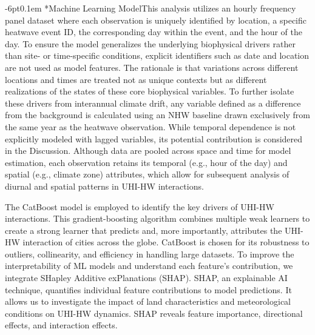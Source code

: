\documentclass[]{nature}
\makeatletter
\renewcommand{\subsection}{\@startsection {subsection}{2}{0pt}%
    {-6pt}{0.1em}%
    {\fontsize{12pt}{14pt}\selectfont\sffamily\bfseries}%
    }
\makeatother
\begin{document}
\subsection*{Machine Learning Model}This analysis utilizes an hourly frequency panel dataset where each observation is uniquely identified by location, a specific heatwave event ID, the corresponding day within the event, and the hour of the day. To ensure the model generalizes the underlying biophysical drivers rather than site- or time-specific conditions, explicit identifiers such as date and location are not used as model features. The rationale is that variations across different locations and times are treated not as unique contexts but as different realizations of the states of these core biophysical variables. To further isolate these drivers from interannual climate drift, any variable defined as a difference from the background is calculated using an NHW baseline drawn exclusively from the same year as the heatwave observation. While temporal dependence is not explicitly modeled with lagged variables, its potential contribution is considered in the Discussion. Although data are pooled across space and time for model estimation, each observation retains its temporal (e.g., hour of the day) and spatial (e.g., climate zone) attributes, which allow for subsequent analysis of diurnal and spatial patterns in UHI-HW interactions.

The CatBoost model is employed to identify the key drivers of UHI-HW interactions. This gradient-boosting algorithm combines multiple weak learners to create a strong learner that predicts and, more importantly, attributes the UHI-HW interaction of cities across the globe. CatBoost is chosen for its robustness to outliers, collinearity, and efficiency in handling large datasets. To improve the interpretability of ML models and understand each feature's contribution, we integrate SHapley Additive exPlanations (SHAP). SHAP, an explainable AI technique, quantifies individual feature contributions to model predictions. It allows us to investigate the impact of land characteristics and meteorological conditions on UHI-HW dynamics. SHAP reveals feature importance, directional effects, and interaction effects.
\end{document}
